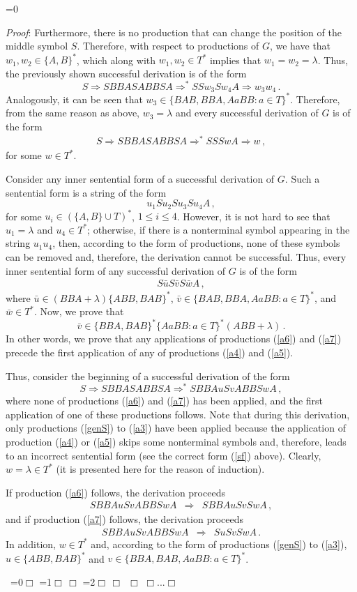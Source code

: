 \documentclass[copyright]{eptcs}
\makeatletter
\newcounter{d@proof}\let\thed@proof\relax\setcounter{d@proof}{0}
\newcommand*{\qed}{$\Box$}
\newenvironment{proof}{\ifnum \value{d@proof}=0{\setcounter{claim}{0}}\else\fi
  \stepcounter{d@proof}\par\noindent
  {\rmfamily\itshape\mdseries Proof\/}:\hspace{\labelsep}\ignorespaces}{\addtocounter{d@proof}{-1}\mbox{}\nolinebreak\hfill~\ifnum \value{d@proof}=0{\qed}\else
    \ifnum \value{d@proof}=1{\qed\nolinebreak\,\nolinebreak\qed}\else
      \ifnum \value{d@proof}=2{\qed\nolinebreak\,\nolinebreak\qed
          \nolinebreak\,\nolinebreak\qed}\else
        {\qed\nolinebreak...\nolinebreak\qed}\fi\fi\fi
  \medbreak
}
\newcommand{\Ra}{\Rightarrow}
\newcommand{\eps}{\lambda}
\makeatother
\begin{document}
\begin{proof}
    Furthermore, there is no production that can change the position of the middle 
    symbol $S$. Therefore, with respect to productions of $G$, we have 
    that
    $w_1, w_2\in \{A,B\}^*$, which along with $w_1,w_2\in T^*$ implies that $w_1=w_2=\eps$. Thus, the previously shown successful derivation is of the form \[S\Ra SBBASABBSA \Ra^* SSw_3Sw_4A \Ra w_3w_4\,.\] Analogously, it can be seen that $w_3\in\{BAB,BBA,AaBB : a\in T\}^*$. Therefore, from the same reason as above, $w_3=\eps$ and every successful derivation of $G$ is of the form
    \begin{eqnarray}
      S \Ra SBBASABBSA \Ra^* SSSwA \Ra w\,,
    \end{eqnarray}
    for some $w\in T^*$.

    Consider any inner sentential form of a successful derivation of $G$. Such a sentential form is a string of the form \[u_1Su_2Su_3Su_4A\,,\] for some $u_i\in (\{A,B\}\cup T)^*$, $1\le i\le 4$. However, it is not hard to see that $u_1=\eps$ and $u_4\in T^*$; otherwise, if there is a nonterminal symbol appearing in the string $u_1u_4$, then, according to the form of productions, none of these symbols can be removed and, therefore, the derivation cannot be successful. Thus, every inner sentential form of any successful derivation of $G$ is of the form
    \begin{eqnarray}\label{sf}
      S\bar{u}S\bar{v}S\bar{w}A\,,
    \end{eqnarray}
    where $\bar{u}\in(BBA+\eps)\{ABB,BAB\}^*$, $\bar{v}\in\{BAB,BBA,AaBB : a\in T\}^*$, and $\bar{w}\in T^*$. Now, we prove that \[\bar{v}\in\{BBA,BAB\}^*\{AaBB : a\in T\}^*(ABB+\eps)\,.\] In other words, we prove that any applications of productions (\ref{a6}) and (\ref{a7}) precede the first application of any of productions (\ref{a4}) and (\ref{a5}).

    Thus, consider the beginning of a successful derivation of the form \[S\Ra SBBASABBSA \Ra^* SBBAuSvABBSwA\,,\] where none of productions (\ref{a6}) and (\ref{a7}) has been applied, and the first application of one of these productions follows. Note that during this derivation, only productions (\ref{genS}) to (\ref{a3}) have been applied because the application of production (\ref{a4}) or (\ref{a5}) skips some nonterminal symbols and, therefore, leads to an incorrect sentential form (see the correct form (\ref{sf}) above). Clearly, $w=\eps\in T^*$ (it is presented here for the reason of induction).

    If production (\ref{a6}) follows, the derivation proceeds
    \begin{eqnarray}
      SBBAuSvABBSwA & \Ra & SBBAuSvSwA\,,
    \end{eqnarray}
    and if production (\ref{a7}) follows, the derivation proceeds
    \begin{eqnarray}
      SBBAuSvABBSwA & \Ra & SuSvSwA\,.
    \end{eqnarray}
    In addition, $w\in T^*$ and, according to the form of productions (\ref{genS}) 
    to (\ref{a3}),
    $u\in\{ABB,BAB\}^*$ and $v\in\{BBA,BAB,AaBB : a\in T\}^*$.


\end{proof}
\end{document}
